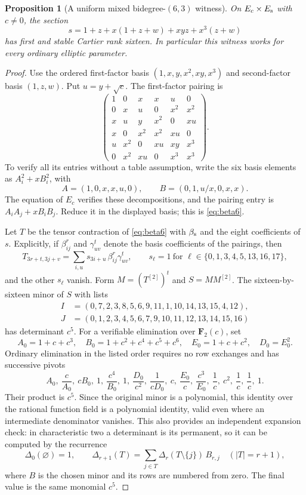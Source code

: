 \documentclass[11pt]{article}
\newtheorem{proposition}[theorem]{Proposition}
\theoremstyle{definition}\newtheorem{definition}[theorem]{Definition}
\theoremstyle{remark}\newtheorem{remark}[theorem]{Remark}
\newcommand{\FF}{\mathbf F}
\begin{document}
\begin{proposition}[A uniform mixed bidegree-$(6,3)$ witness]\label{prop:mixed-six}
On $E_c\times E_{\rm s}$ with $c\ne0$, the section
\[
       s=1+z+x(1+z+w)+xyz+x^3(z+w)
\]
has first and stable Cartier rank sixteen. In particular this witness works for every ordinary elliptic parameter.
\end{proposition}
\begin{proof}
Use the ordered first-factor basis $(1,x,y,x^2,xy,x^3)$ and second-factor basis $(1,z,w)$. Put $u=y+\sqrt c$. The first-factor pairing is
\begin{equation}\label{eq:beta6}
\begin{pmatrix}
1&0&x&x&u&0\\
0&x&u&0&x^2&x^2\\
x&u&y&x^2&0&xu\\
x&0&x^2&x^2&xu&0\\
u&x^2&0&xu&xy&x^3\\
0&x^2&xu&0&x^3&x^3
\end{pmatrix}.
\end{equation}
To verify all its entries without a table assumption, write the six basis elements as $A_i^2+xB_i^2$, with
\[
 A=(1,0,x,x,u,0),\qquad B=(0,1,u/x,0,x,x).
\]
The equation of $E_c$ verifies these decompositions, and the pairing entry is $A_iA_j+xB_iB_j$. Reduce it in the displayed basis; this is \eqref{eq:beta6}.

Let $T$ be the tensor contraction of \eqref{eq:beta6} with $\beta_{\rm s}$ and the eight coefficients of $s$. Explicitly, if $\beta_{ij}^r$ and $\gamma_{uv}^t$ denote the basis coefficients of the pairings, then
\[
 T_{3r+t,3j+v}=\sum_{i,u}s_{3i+u}\,\beta_{ij}^r\gamma_{uv}^t,
 \qquad s_\ell=1\ \text{for }\ell\in\{0,1,3,4,5,13,16,17\},
\]
and the other $s_\ell$ vanish. Form $M=(T^{[2]})^t$ and $S=MM^{[2]}$. The sixteen-by-sixteen minor of $S$ with lists
\begin{align*}
 I&=(0,7,2,3,8,5,6,9,11,1,10,14,13,15,4,12),\\
 J&=(0,1,2,3,4,5,6,7,9,10,11,12,13,14,15,16)
\end{align*}
has determinant $c^5$. For a verifiable elimination over $\FF_2(c)$, set
\[
 A_0=1+c+c^3,\quad B_0=1+c^2+c^4+c^5+c^6,
 \quad E_0=1+c+c^2,\quad D_0=E_0^2.
\]
Ordinary elimination in the listed order requires no row exchanges and has successive pivots
\[
 A_0,\ \frac c{A_0},\ cB_0,\ 1,\ \frac{c^4}{B_0},\ 1,
 \ \frac{D_0}{c^2},\ \frac1{cD_0},\ c,\ \frac{E_0}c,
 \ \frac{c^3}{E_0},\ \frac1c,\ c^2,\ \frac1c,\ \frac1c,\ 1.
\]
Their product is $c^5$. Since the original minor is a polynomial, this identity over the rational function field is a polynomial identity, valid even where an intermediate denominator vanishes. This also provides an independent expansion check: in characteristic two a determinant is its permanent, so it can be computed by the recurrence
\[
 \Delta_0(\varnothing)=1,\qquad
 \Delta_{r+1}(T)=\sum_{j\in T}\Delta_r(T\setminus\{j\})\,B_{r,j}
 \quad(|T|=r+1),
\]
where $B$ is the chosen minor and its rows are numbered from zero. The final value is the same monomial $c^5$.


\end{proof}
\end{document}
